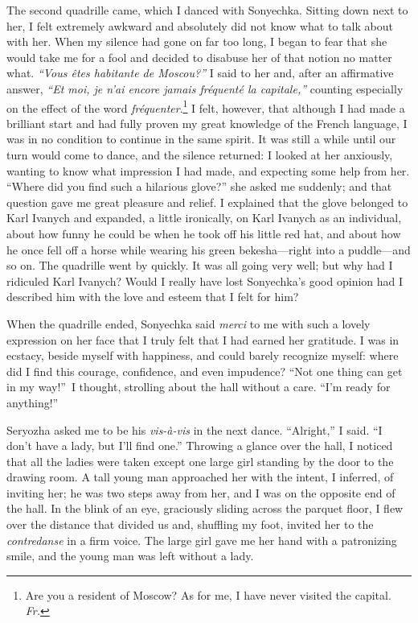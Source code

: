 The second quadrille came, which I danced with Sonyechka. Sitting down next to her, I felt extremely awkward and absolutely did not know what to talk about with her. When my silence had gone on far too long, I began to fear that she would take me for a fool and decided to disabuse her of that notion no matter what. \textit{``Vous \^etes habitante de Moscou?''} I said to her and, after an affirmative answer, \textit{``Et moi, je n'ai encore jamais fr\'equent\'e la capitale,''} counting especially on the effect of the word \textit{fr\'equenter}.\footnote{Are you a resident of Moscow? As for me, I have never visited the capital. \textit{Fr.}} I felt, however, that although I had made a brilliant start and had fully proven my great knowledge of the French language, I was in no condition to continue in the same spirit. It was still a while until our turn would come to dance, and the silence returned: I looked at her anxiously, wanting to know what impression I had made, and expecting some help from her. ``Where did you find such a hilarious glove?'' she asked me suddenly; and that question gave me great pleasure and relief. I explained that the glove belonged to Karl Ivanych and expanded, a little ironically, on Karl Ivanych as an individual, about how funny he could be when he took off his little red hat, and about how he once fell off a horse while wearing his green bekesha---right into a puddle---and so on. The quadrille went by quickly. It was all going very well; but why had I ridiculed Karl Ivanych? Would I really have lost Sonyechka's good opinion had I described him with the love and esteem that I felt for him? %

When the quadrille ended, Sonyechka said \textit{merci} to me with such a lovely expression on her face that I truly felt that I had earned her gratitude. I was in ecstacy, beside myself with happiness, and could barely recognize myself: where did I find this courage, confidence, and even impudence? ``Not one thing can get in my way!''~I thought, strolling about the hall without a care. ``I'm ready for anything!'' %

Seryozha asked me to be his \textit{vis-\`a-vis} in the next dance. ``Alright,'' I said. ``I don't have a lady, but I'll find one.'' Throwing a glance over the hall, I noticed that all the ladies were taken except one large girl standing by the door to the drawing room. A tall young man approached her with the intent, I inferred, of inviting her; he was two steps away from her, and I was on the opposite end of the hall. In the blink of an eye, graciously sliding across the parquet floor, I flew over the distance that divided us and, shuffling my foot, invited her to the \textit{contredanse} in a firm voice. The large girl gave me her hand with a patronizing smile, and the young man was left without a lady. %

